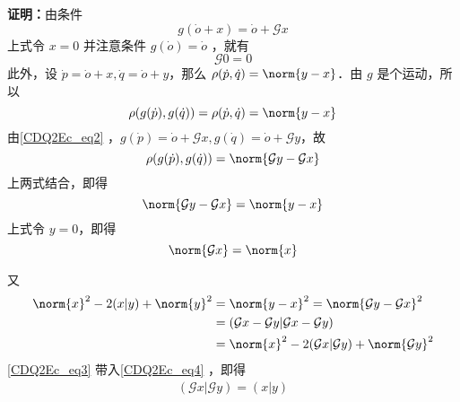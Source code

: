 \textbf{证明：}由条件
\begin{equation}\label{CDQ2Ec_eq2}
g(\dot o+x)=\dot o+\mathcal G x
\end{equation}
上式令 $x=0$ 并注意条件 $g(\dot o)=\dot o$ ，就有
\begin{equation}
\mathcal G 0=0
\end{equation}
此外，设 $\dot p=\dot o+x,\dot q=\dot o+y$，那么 $\rho(\dot p,\dot q)=\norm{y-x}$．由 $g$ 是个运动，所以
\begin{equation}
\rho(g(\dot p),g(\dot q))=\rho(\dot p,\dot q)=\norm{y-x}
\end{equation}
由\autoref{CDQ2Ec_eq2} ，$g(\dot p)=\dot o+\mathcal G x, g(\dot q)=\dot o+\mathcal G y$，故
\begin{equation}
\rho(g(\dot p),g(\dot q))=\norm{\mathcal Gy-\mathcal Gx}
\end{equation}
上两式结合，即得
\begin{equation}
\norm{\mathcal Gy-\mathcal Gx}=\norm{y-x}
\end{equation}
上式令 $y=0$，即得
\begin{equation}\label{CDQ2Ec_eq3}
\norm{\mathcal G x}=\norm{x}
\end{equation}

又
\begin{equation}\label{CDQ2Ec_eq4}
\begin{aligned}
\norm{x}^2-2(x|y)+\norm{y}^2&=\norm{y-x}^2=\norm{\mathcal G y-\mathcal G x}^2\\
&=(\mathcal G x-\mathcal G y|\mathcal G x-\mathcal G y)\\
&=\norm{x}^2-2(\mathcal G x|\mathcal G y)+\norm{\mathcal G y}^2
\end{aligned}
\end{equation}
\autoref{CDQ2Ec_eq3} 带入\autoref{CDQ2Ec_eq4} ，即得
\begin{equation}\label{CDQ2Ec_eq5}
\begin{aligned}
(\mathcal G x|\mathcal G y)=(x|y)
\end{aligned}
\end{equation}

